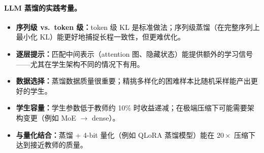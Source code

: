 \paragraph{LLM 蒸馏的实践考量。}
\label{practical-considerations-for-llm-distillation.}

\begin{itemize}
  \item \textbf{序列级 vs.~token 级：}token 级 KL 是标准做法；序列级蒸馏（在完整序列上最小化 KL）能更好地捕捉长程一致性，但更难优化。
  \item \textbf{逐层提示：}匹配中间表示（attention 图、隐藏状态）能提供额外的学习信号——尤其在学生架构不同的情况下有用。
  \item \textbf{数据选择：}蒸馏数据质量很重要；精挑多样化的困难样本比随机采样能产出更好的学生。
  \item \textbf{学生容量：}学生参数低于教师约 10\% 时收益递减；在极端压缩下可能需要架构变更（例如 MoE $\to$ dense）。
  \item \textbf{与量化结合：}蒸馏 + 4-bit 量化（例如 QLoRA 蒸馏模型）能在 $20\times$ 压缩下达到接近教师的质量。
\end{itemize}

